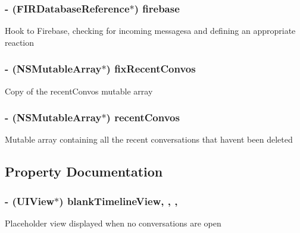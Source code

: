 \subsubsection[{firebase}]{\setlength{\rightskip}{0pt plus 5cm}-\/ ({\bf F\+I\+R\+Database\+Reference}$\ast$) firebase\hspace{0.3cm}{\ttfamily [protected]}}\label{category_e_s_recent_view_07_08_aac4c56d218e6afbfbdbcc1dcb8ef737a}
Hook to Firebase, checking for incoming messagesa and defining an appropriate reaction \hypertarget{category_e_s_recent_view_07_08_a5eb0a1ad011f8828c6d3b9c542a56913}{}
\subsubsection[{fix\+Recent\+Convos}]{\setlength{\rightskip}{0pt plus 5cm}-\/ (N\+S\+Mutable\+Array$\ast$) fix\+Recent\+Convos\hspace{0.3cm}{\ttfamily [protected]}}\label{category_e_s_recent_view_07_08_a5eb0a1ad011f8828c6d3b9c542a56913}
Copy of the recent\+Convos mutable array \hypertarget{category_e_s_recent_view_07_08_aacf2b8c9021a727d30297f0b85081db4}{}
\subsubsection[{recent\+Convos}]{\setlength{\rightskip}{0pt plus 5cm}-\/ (N\+S\+Mutable\+Array$\ast$) recent\+Convos\hspace{0.3cm}{\ttfamily [protected]}}\label{category_e_s_recent_view_07_08_aacf2b8c9021a727d30297f0b85081db4}
Mutable array containing all the recent conversations that haven\textquotesingle{}t been deleted 

\subsection{Property Documentation}
\hypertarget{category_e_s_recent_view_07_08_a9caa6fa62a029b035245a785d01aa053}{}
\subsubsection[{blank\+Timeline\+View}]{\setlength{\rightskip}{0pt plus 5cm}-\/ (U\+I\+View$\ast$) blank\+Timeline\+View\hspace{0.3cm}{\ttfamily [read]}, {\ttfamily [write]}, {\ttfamily [nonatomic]}, {\ttfamily [strong]}}\label{category_e_s_recent_view_07_08_a9caa6fa62a029b035245a785d01aa053}
Placeholder view displayed when no conversations are open \hypertarget{category_e_s_recent_view_07_08_a5691c509462de8746726d7ffa92b4a1d}{}
